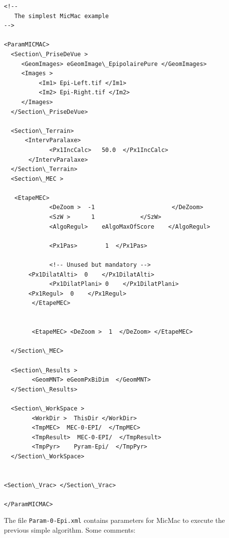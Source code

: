 {\scriptsize
\setlength{\columnseprule}{0.5pt}
\begin{multicols}{2}
\begin{verbatim}
<!--
   The simplest MicMac example
-->

<ParamMICMAC>
  <Section\_PriseDeVue >
     <GeomImages> eGeomImage\_EpipolairePure </GeomImages>
     <Images >
          <Im1> Epi-Left.tif </Im1>
          <Im2> Epi-Right.tif </Im2>
     </Images>
  </Section\_PriseDeVue>

  <Section\_Terrain>
      <IntervParalaxe>
             <Px1IncCalc>   50.0  </Px1IncCalc>
       </IntervParalaxe>
  </Section\_Terrain>
  <Section\_MEC >

   <EtapeMEC>
             <DeZoom >  -1                      </DeZoom>
             <SzW >      1             </SzW>
             <AlgoRegul>    eAlgoMaxOfScore    </AlgoRegul>

             <Px1Pas>        1  </Px1Pas>

             <!-- Unused but mandatory -->
       <Px1DilatAlti>  0    </Px1DilatAlti>
             <Px1DilatPlani> 0    </Px1DilatPlani>
       <Px1Regul>  0    </Px1Regul>
        </EtapeMEC>


        <EtapeMEC> <DeZoom >  1  </DeZoom> </EtapeMEC>

  </Section\_MEC>

  <Section\_Results >
        <GeomMNT> eGeomPxBiDim  </GeomMNT>
  </Section\_Results>

  <Section\_WorkSpace >
        <WorkDir >  ThisDir </WorkDir>
        <TmpMEC>  MEC-0-EPI/  </TmpMEC>
        <TmpResult>  MEC-0-EPI/  </TmpResult>
        <TmpPyr>    Pyram-Epi/  </TmpPyr>
  </Section\_WorkSpace>


<Section\_Vrac> </Section\_Vrac>

</ParamMICMAC>
\end{verbatim}
\end{multicols}
}

The file {\tt Param-0-Epi.xml} contains parameters for MicMac  to execute
the previous simple algorithm. Some comments:

